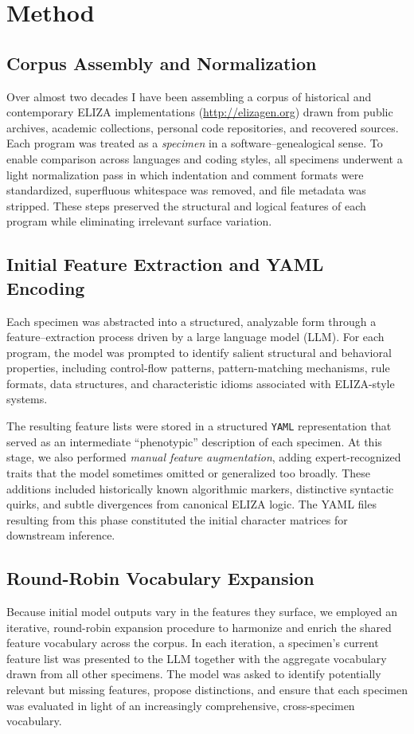 \documentclass{article}
\begin{document}
\section{Method}

\subsection{Corpus Assembly and Normalization}

Over almost two decades I have been assembling a corpus of historical and contemporary ELIZA implementations (\url{http://elizagen.org}) drawn from public archives, academic collections, personal code repositories, and recovered sources. Each program was treated as a \emph{specimen} in a software–genealogical sense. To enable comparison across languages and coding styles, all specimens underwent a light normalization pass in which indentation and comment formats were standardized, superfluous whitespace was removed, and file metadata was stripped. These steps preserved the structural and logical features of each program while eliminating irrelevant surface variation.

\subsection{Initial Feature Extraction and YAML Encoding}
Each specimen was abstracted into a structured, analyzable form through a feature–extraction process driven by a large language model (LLM). For each program, the model was prompted to identify salient structural and behavioral properties, including control-flow patterns, pattern-matching mechanisms, rule formats, data structures, and characteristic idioms associated with ELIZA-style systems.

The resulting feature lists were stored in a structured \texttt{YAML} representation that served as an intermediate ``phenotypic'' description of each specimen. At this stage, we also performed \emph{manual feature augmentation}, adding expert-recognized traits that the model sometimes omitted or generalized too broadly. These additions included historically known algorithmic markers, distinctive syntactic quirks, and subtle divergences from canonical ELIZA logic. The YAML files resulting from this phase constituted the initial character matrices for downstream inference.

\subsection{Round-Robin Vocabulary Expansion}
Because initial model outputs vary in the features they surface, we employed an iterative, round-robin expansion procedure to harmonize and enrich the shared feature vocabulary across the corpus. In each iteration, a specimen's current feature list was presented to the LLM together with the aggregate vocabulary drawn from all other specimens. The model was asked to identify potentially relevant but missing features, propose distinctions, and ensure that each specimen was evaluated in light of an increasingly comprehensive, cross-specimen vocabulary.
\end{document}
